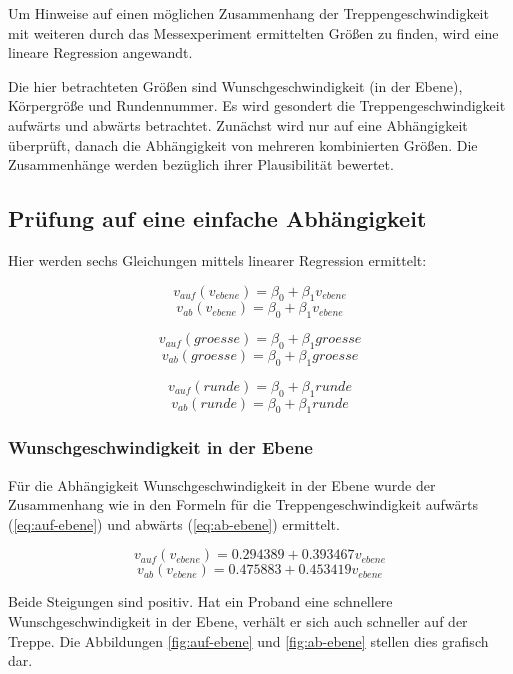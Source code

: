 Um Hinweise auf einen möglichen Zusammenhang der Treppengeschwindigkeit mit weiteren durch das Messexperiment ermittelten Größen zu finden, wird eine lineare 
Regression angewandt.

Die hier betrachteten Größen sind Wunschgeschwindigkeit (in der Ebene),
Körpergröße und Rundennummer. Es wird gesondert die Treppengeschwindigkeit aufwärts und abwärts betrachtet.
Zunächst wird nur auf eine Abhängigkeit überprüft, danach die Abhängigkeit von mehreren kombinierten Größen. Die Zusammenhänge werden bezüglich ihrer Plausibilität bewertet.

\subsection{Prüfung auf eine einfache Abhängigkeit}

Hier werden sechs Gleichungen mittels linearer Regression ermittelt: 

\[v_{auf}(v_{ebene}) = \beta_0 + \beta_1 v_{ebene}\]
\[v_{ab}(v_{ebene}) = \beta_0 + \beta_1 v_{ebene}\]

\[v_{auf}(groesse) = \beta_0 + \beta_1 groesse\]
\[v_{ab}(groesse) = \beta_0 + \beta_1 groesse\]

\[v_{auf}(runde) = \beta_0 + \beta_1 runde\]
\[v_{ab}(runde) = \beta_0 + \beta_1 runde\]

\subsubsection{Wunschgeschwindigkeit in der Ebene}

Für die Abhängigkeit Wunschgeschwindigkeit in der Ebene wurde 
der Zusammenhang wie in den Formeln für die Treppengeschwindigkeit aufwärts (\ref{eq:auf-ebene}) und abwärts (\ref{eq:ab-ebene}) ermittelt. 

\begin{equation} \label{eq:auf-ebene}
	v_{auf}(v_{ebene}) = 0.294389 + 0.393467 v_{ebene}
\end{equation}
\begin{equation} \label{eq:ab-ebene}
	v_{ab}(v_{ebene}) = 0.475883 + 0.453419 v_{ebene}
\end{equation}

Beide Steigungen sind positiv. Hat ein Proband eine schnellere Wunschgeschwindigkeit in der Ebene, verhält er sich auch schneller auf 
der Treppe. Die Abbildungen \ref{fig:auf-ebene} und \ref{fig:ab-ebene}
stellen dies grafisch dar. 

